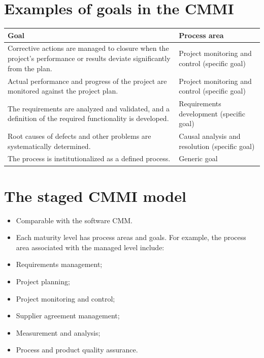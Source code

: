 \section{Examples of goals in the CMMI}

\begin{table}[h!]
\centering
\begin{tabular}{ |p{5cm}|p{5cm}|  }
\hline
Goal & Process area \\
\hline
\hline
Corrective actions are managed to closure when the project’s performance or results deviate significantly from the plan. & Project monitoring and control (specific goal)\\
\hline
Actual performance and progress of the project are monitored against the project plan. & Project monitoring and control (specific goal)\\
\hline
The	requirements	are	analyzed	and validated, and a definition of the required functionality is developed. & Requirements development (specific goal)\\
\hline
Root causes of defects and other problems are systematically determined. & Causal analysis and resolution (specific goal)\\
\hline
The process is institutionalized as a defined process. & Generic goal\\
\hline
\end{tabular}

\label{table:T9_5}
\end{table}





\section{The staged CMMI model}
\begin{itemize}


\item Comparable with the software CMM.

\item Each maturity level has process areas and goals. For example, the process area associated with the managed level include:

   \item Requirements management;    \item Project planning;
   \item Project monitoring and control;    \item Supplier agreement management;    \item Measurement and analysis;
   \item Process and product quality assurance.

\end{itemize}
\newpage
